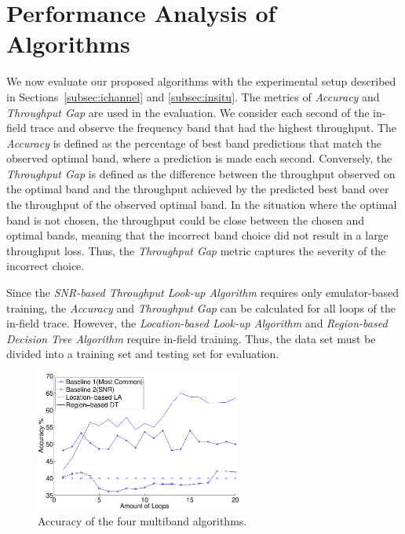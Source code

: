 \section{Performance Analysis of Algorithms}
\label{sec:vncdata process}

We now evaluate our proposed
algorithms with the experimental setup described in
Sections~\ref{subsec:ichannel} and \ref{subsec:insitu}.
The metrics of
{\it Accuracy} and {\it Throughput Gap} are used in the evaluation.
We consider each second of the in-field trace and
observe the frequency band that had the highest 
throughput.  The \emph{Accuracy} is defined as the percentage of 
best band predictions that match the observed optimal band, where a prediction
is made each second.  Conversely, the \emph{Throughput Gap} is defined
as the difference between the throughput observed on the optimal band
and the throughput achieved by the predicted best band over the
throughput of the observed optimal band. 
In the situation where the optimal band is not chosen, the throughput could be close between the chosen and optimal bands, meaning that the
incorrect band choice did not result in a large throughput loss. Thus, the 
\emph{Throughput Gap} metric captures the severity of the incorrect choice.

%
%

Since the \emph{SNR-based Throughput Look-up Algorithm} requires only 
emulator-based training, the \emph{Accuracy} and \emph{Throughput Gap} can 
be calculated for all loops of the in-field trace.  However, the 
\emph{Location-based Look-up Algorithm} and \emph{Region-based Decision
Tree Algorithm} require in-field training. Thus, the data set must be
divided into a training set and testing set for evaluation.

\begin{figure}
\centering
\includegraphics[width=68mm]{figures/performance_accuracy}
\vspace{-0.1in}
\caption{Accuracy of the four multiband algorithms.}
\label{fig:performance}
\end{figure}

